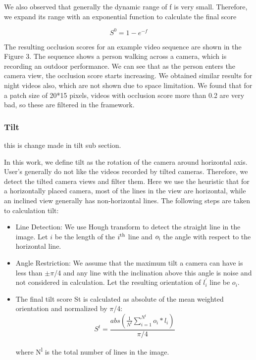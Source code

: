 \documentclass{new}
\begin{document}
We also observed that generally the dynamic range of f is very
small. Therefore, we expand its range with an exponential function
to calculate the final score %

\begin{equation}
S^0 = 1 - e^{-f}
\end{equation}


The resulting occlusion scores for an example video sequence
are shown in the Figure 3. The sequence shows a person walking
across a camera, which is recording an outdoor performance. We
can see that as the person enters the camera view, the occlusion
score starts increasing. We obtained similar results for night videos
also, which are not shown due to space limitation. We found that
for a patch size of 20*15 pixels, videos with occlusion score more
than 0.2 are very bad, so these are filtered in the framework.

\subsubsection{Tilt}
this is change made in tilt sub section.

In this work, we define tilt as the rotation of the camera around
horizontal axis. User's generally do not like the videos recorded
by tilted cameras. Therefore, we detect the tilted camera views
and filter them. Here we use the heuristic that for a horizontally
placed camera, most of the lines in the view are horizontal, while
an inclined view generally has non-horizontal lines. The following
steps are taken to calculation tilt:

\begin{itemize}

\item Line Detection: We use Hough transform to detect the straight
line in the image. Let $i$ be the length of the $i\textsuperscript{th}$
 line and $o\textsubscript{i}$
the angle with respect to the horizontal line.

\item Angle Restriction: We assume that the maximum tilt a camera can have is less than $\pm \pi$/4 and any line with the inclination above this angle is noise and not considered in calculation. Let the resulting orientation of $l_i^{'}$ line be $o_i$.

\item The final tilt score St is calculated as absolute of the mean weighted orientation and normalized by $\pi$/4:
\begin{equation}
S^t = \frac{abs(\frac{1}{N^l}\sum_{i=1}^{N^l}o_i*l_i)}{\pi /4}
\end{equation}

where N\textsuperscript{l} is the total number of lines in the image.
\end{itemize}
\end{document}
